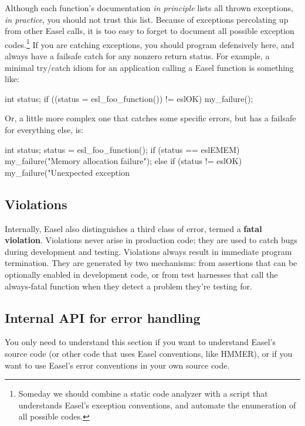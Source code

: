 Although each function's documentation \emph{in principle} lists all
thrown exceptions, \emph{in practice}, you should not trust this
list. Because of exceptions percolating up from other Easel calls, it
is too easy to forget to document all possible exception
codes.\footnote{Someday we should combine a static code analyzer with
a script that understands Easel's exception conventions, and automate
the enumeration of all possible codes.} If you are catching
exceptions, you should program defensively here, and always have a
failsafe catch for any nonzero return status. For example, a minimal
try/catch idiom for an application calling a Easel function is
something like:

\begin{cchunk}
     int status;
     if ((status = esl_foo_function()) != eslOK)  my_failure();
\end{cchunk}

Or, a little more complex one that catches some specific errors, but
has a failsafe for everything else, is:

\begin{cchunk}
     int status;
     status = esl_foo_function();
     if      (status == eslEMEM) my_failure("Memory allocation failure");
     else if (status != eslOK)   my_failure("Unexpected exception %
\end{cchunk}


\subsection{Violations}

Internally, Easel also distinguishes a third class of error, termed a
\textbf{fatal violation}. Violations never arise in production code;
they are used to catch bugs during development and testing. Violations
always result in immediate program termination. They are generated by
two mechanisms: from assertions that can be optionally enabled in
development code, or from test harnesses that call the always-fatal
 function when they detect a problem they're
testing for.


\subsection{Internal API for error handling}

You only need to understand this section if you want to understand
Easel's source code (or other code that uses Easel conventions, like
HMMER), or if you want to use Easel's error conventions in your own
source code.

